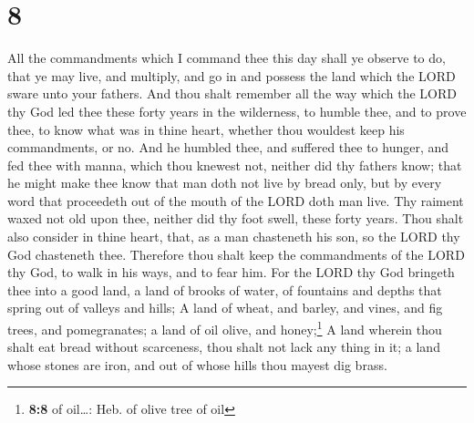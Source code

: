 \hypertarget{section-7}{%
\section{8}\label{section-7}}

 All the commandments which I command thee this day shall
ye observe to do, that ye may live, and multiply, and go in and possess
the land which the LORD sware unto your fathers.  And thou
shalt remember all the way which the LORD thy God led thee these forty
years in the wilderness, to humble thee, and to prove thee, to know what
was in thine heart, whether thou wouldest keep his commandments, or no.
 And he humbled thee, and suffered thee to hunger, and fed
thee with manna, which thou knewest not, neither did thy fathers know;
that he might make thee know that man doth not live by bread only, but
by every word that proceedeth out of the mouth of the LORD doth man
live.  Thy raiment waxed not old upon thee, neither did
thy foot swell, these forty years.  Thou shalt also
consider in thine heart, that, as a man chasteneth his son, so the LORD
thy God chasteneth thee.  Therefore thou shalt keep the
commandments of the LORD thy God, to walk in his ways, and to fear him.
 For the LORD thy God bringeth thee into a good land, a
land of brooks of water, of fountains and depths that spring out of
valleys and hills;  A land of wheat, and barley, and
vines, and fig trees, and pomegranates; a land of oil olive, and
honey;\footnote{\textbf{8:8} of oil\ldots: Heb. of olive tree of oil}
 A land wherein thou shalt eat bread without scarceness,
thou shalt not lack any thing in it; a land whose stones are iron, and
out of whose hills thou mayest dig brass.

